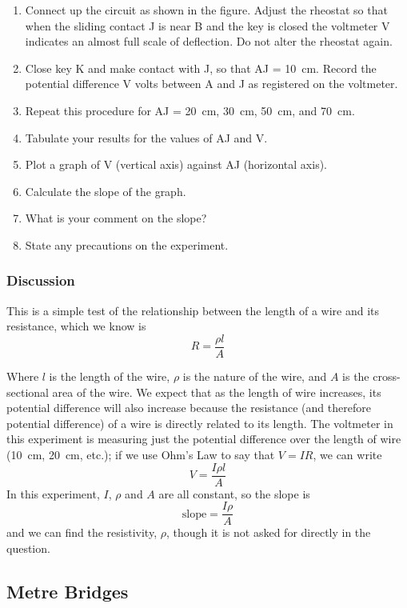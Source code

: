 \documentclass[12pt,a4paper]{report}
\begin{document}

\begin{enumerate}
\item{Connect up the circuit as shown in the figure. Adjust the rheostat so that when the sliding
contact J is near B and the key is closed the voltmeter V indicates an almost full scale
of deflection. Do not alter the rheostat again.}
\item{Close key K and make contact with J, so that AJ = 10~cm. Record the potential
difference V volts between A and J as registered on the voltmeter.}
\item{Repeat this procedure for AJ = 20~cm, 30~cm, 50~cm, and 70~cm.}
\item{Tabulate your results for the values of AJ and V.}
\item{Plot a graph of V (vertical axis) against AJ (horizontal axis).}
\item{Calculate the slope of the graph.}
\item{What is your comment on the slope?}
\item{State any precautions on the experiment.}
\end{enumerate}

\subsubsection{Discussion}

This is a simple test of the relationship between the length of a wire and its
resistance, which we know is $$R=\frac{\rho l}{A} $$

Where $l$ is the length of the wire, $\rho$ is the nature of the wire, and $A$ is the cross-sectional
area of the wire. We expect that as the length of wire increases, its potential difference
will also increase because the resistance (and therefore potential difference) of a wire is
directly related to its length. The voltmeter in this experiment is measuring just the
potential difference over the length of wire (10~cm, 20~cm, etc.); if we use Ohm’s Law to say that $V = IR$, we can write
$$ V = \frac{I \rho l}{A} $$
In this experiment, $I$, $\rho$ and $A$ are all constant, so the slope is
$$\mathrm{slope} = \frac{I \rho}{A} $$
and we can find the resistivity, $\rho$, though it is not asked for directly in the question.

\subsection{Metre Bridges}
\end{document}
